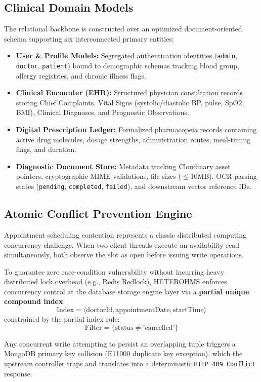 \documentclass[conference]{IEEEtran}
\begin{document}
\subsection{Clinical Domain Models}
The relational backbone is constructed over an optimized document-oriented schema supporting six interconnected primary entities:
\begin{itemize}
    \item \textbf{User \& Profile Models:} Segregated authentication identities (\texttt{admin}, \texttt{doctor}, \texttt{patient}) bound to demographic schemas tracking blood group, allergy registries, and chronic illness flags.
    \item \textbf{Clinical Encounter (EHR):} Structured physician consultation records storing Chief Complaints, Vital Signs (systolic/diastolic BP, pulse, SpO2, BMI), Clinical Diagnoses, and Prognostic Observations.
    \item \textbf{Digital Prescription Ledger:} Formalized pharmacopeia records containing active drug molecules, dosage strengths, administration routes, meal-timing flags, and duration.
    \item \textbf{Diagnostic Document Store:} Metadata tracking Cloudinary asset pointers, cryptographic MIME validations, file sizes ($\le 10$MB), OCR parsing states (\texttt{pending}, \texttt{completed}, \texttt{failed}), and downstream vector reference IDs.
\end{itemize}

\subsection{Atomic Conflict Prevention Engine}
Appointment scheduling contention represents a classic distributed computing concurrency challenge. When two client threads execute an availability read simultaneously, both observe the slot as open before issuing write operations.

To guarantee zero race-condition vulnerability without incurring heavy distributed lock overhead (e.g., Redis Redlock), HETEROHMS enforces concurrency control at the database storage engine layer via a \textbf{partial unique compound index}:
$$\text{Index} = \langle \text{doctorId}, \text{appointmentDate}, \text{startTime} \rangle$$
constrained by the partial index rule:
$$\text{Filter} = \{ \text{status} \neq \text{'cancelled'} \}$$

Any concurrent write attempting to persist an overlapping tuple triggers a MongoDB primary key collision (E11000 duplicate key exception), which the upstream controller traps and translates into a deterministic \texttt{HTTP 409 Conflict} response.
\end{document}
